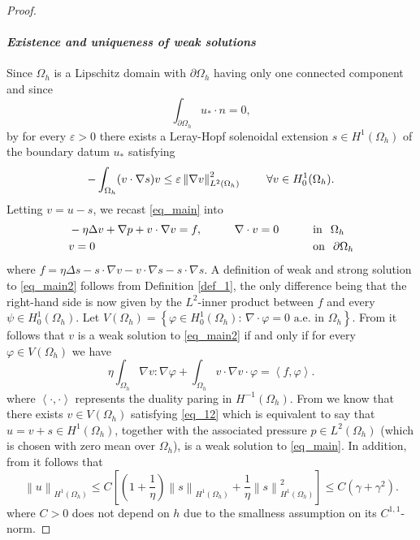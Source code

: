 \documentclass[11pt,a4paper]{amsart}
\theoremstyle{remark}
\theoremstyle{definition}
\numberwithin{equation}{section}
\numberwithin{proposition}{section}
\begin{document}
\begin{proof}
\paragraph{\emph{Existence and uniqueness of weak solutions}} Since $\Omega_h$ is a Lipschitz domain with $\partial\Omega_h$ having only one connected component and since
\begin{equation*}
\int_{\partial\Omega_h}u_*\cdot n =0,
\end{equation*}
by \cite{LE1,Hopf1941} for every $\varepsilon>0$ there exists a Leray-Hopf solenoidal extension $s\in H^1(\Omega_h)$ of the boundary datum $u_*$ satisfying
\begin{equation*}
-\int_{\Omega_h}(v\cdot\nabla s)v\le\varepsilon\left\|\nabla v\right\|_{L^2(\Omega_h)}^2\hspace{.3in}\forall v\in H_0^1(\Omega_h).
\end{equation*}
Letting $v=u-s$, we recast \eqref{eq_main} into
\begin{equation}\label{eq_main2}
\begin{aligned}
&-\eta\Delta v+\nabla p+v\cdot\nabla v=f,&\qquad&\nabla\cdot v=0&\qquad&\mbox{in}\hspace{.1in}\Omega_h\\
&v=0&\qquad&&\qquad&\mbox{on}\hspace{.1in}\partial\Omega_h
\end{aligned}
\end{equation}
where $f=\eta\Delta s-s\cdot\nabla v-v\cdot\nabla s-s\cdot\nabla s$. A definition of weak and strong solution to \eqref{eq_main2} follows from Definition \ref{def_1}, the only difference being that the right-hand side is now given by the $L^2$-inner product between $f$ and every $\psi\in H_0^1(\Omega_h)$. Let $V(\Omega_h)=\left\{\varphi\in H_0^1(\Omega_h):\,\nabla\cdot\varphi=0\text{ a.e. in }\Omega_h\right\}$. From \cite[Lemma IX.1.2]{GA1} it follows that $v$ is a weak solution to \eqref{eq_main2} if and only if for every $\varphi\in V(\Omega_h)$ we have
\begin{equation}\label{eq_12}
\eta\int_{\Omega_h}\nabla v:\nabla\varphi+\int_{\Omega_h}v\cdot\nabla v\cdot\varphi=\left\langle f,\varphi\right\rangle.
\end{equation}
where $\left\langle\cdot,\cdot\right\rangle$ represents the duality paring in $H^{-1}(\Omega_h)$. From \cite[Theorem IX.4.1]{GA1} we know that there exists $v\in V(\Omega_h)$ satisfying \eqref{eq_12} which is equivalent to say that $u=v+s\in H^1(\Omega_h)$, together with the associated pressure $p\in L^2(\Omega_h)$ (which is chosen with zero mean over $\Omega_h$), is a weak solution to \eqref{eq_main}. In addition, from \cite[Theorem IX.4.1]{GA1} it follows that
\begin{equation}\label{eq_21}
\left\|u\right\|_{H^1(\Omega_h)}\le C\left[\left(1+\frac{1}{\eta}\right)\left\|s\right\|_{H^1(\Omega_h)}+\frac{1}{\eta}\left\|s\right\|_{H^1(\Omega_h)}^2\right]\le C\left(\gamma+\gamma^2\right).
\end{equation}
where $C>0$ does not depend on $h$ due to the smallness assumption on  its $C^{1,1}$-norm.


\end{proof}
\end{document}
